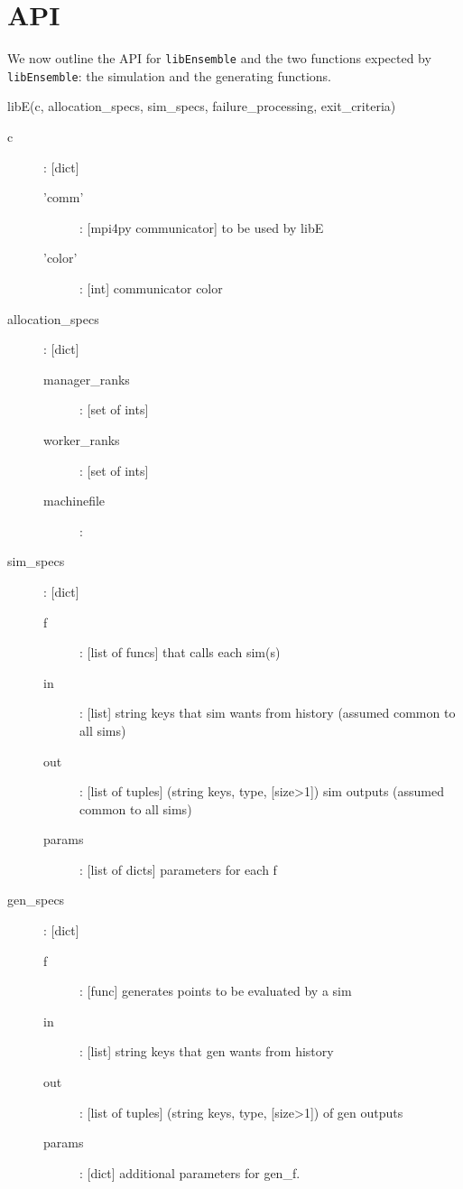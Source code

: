 \documentclass{article}
\newenvironment{allintypewriter}{\ttfamily}{\par}
\newcommand{\libE}{\texttt{libEnsemble}\xspace}
\begin{document}
\section{API}
We now outline the API for \libE and the two functions expected by \libE: the
simulation and the generating functions.

\begin{allintypewriter}
  libE(c, allocation\_specs, sim\_specs, failure\_processing, exit\_criteria)\\

  \begin{description}
    \item[c]: [dict]
      \begin{description}
        \item['comm']: [mpi4py communicator] to be used by libE
        \item['color']: [int] communicator color
      \end{description}

    \item[allocation\_specs]: [dict]
      \begin{description}
        \item[manager\_ranks]: [set of ints]
        \item[worker\_ranks]: [set of ints]
        \item[machinefile]:
      \end{description}

    \item[sim\_specs]: [dict]
      \begin{description}
        \item[f]: [list of funcs] that calls each sim(s)
        \item[in]: [list] string keys that sim wants from history (assumed common to all sims)
        \item[out]: [list of tuples] (string keys, type, [size>1]) sim outputs (assumed common to all sims)
        \item[params]: [list of dicts] parameters for each f
      \end{description}

    \item[gen\_specs]: [dict]
      \begin{description}
        \item[f]: [func] generates points to be evaluated by a sim
        \item[in]: [list] string keys that gen wants from history
        \item[out]: [list of tuples] (string keys, type, [size>1]) of gen outputs
        \item[params]: [dict] additional parameters for gen\_f.
      \end{description}


\end{description}
\end{allintypewriter}
\end{document}
